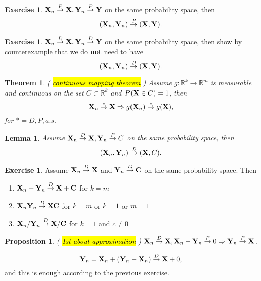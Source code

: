 \documentclass[12pt,a4paper, notitlepage]{book}
\newcommand{\hlc}[2][yellow]{ {\sethlcolor{#1} \hl{#2}} }
\theoremstyle{definition} %
\newtheorem{exercise}[definition]{Exercise}
\theoremstyle{plain} %
\newtheorem{lemma}[definition]{Lemma}
\newtheorem{theorem}[definition]{Theorem}
\newtheorem{proposition}[definition]{Proposition}
\newcommand{\R}{\mathbb R}
\newcommand{\Important}[1]{ {\it \hlc{#1} } }
\begin{document}
\begin{exercise}
${\bf X}_n \overset{P}{\rightarrow} {\bf X}, {\bf Y}_n \overset{P}{\rightarrow} {\bf Y}$ on the same probability space, then 
\[ ({\bf X}_n, {\bf Y}_n) \overset{P}{ \rightarrow} ({\bf X}, {\bf Y}) . \]
\end{exercise}

\begin{exercise}
${\bf X}_n \overset{D}{ \rightarrow} {\bf X}, {\bf Y}_n \overset{D}{\rightarrow} {\bf Y}$ on the same probability space, then show by counterexample that we do {\bf not} need to have 
\[ ({\bf X}_n, {\bf Y}_n) \overset{D}{ \rightarrow} ({\bf X}, {\bf Y}) . \]
\end{exercise}

\begin{theorem} (\Important{ continuous mapping theorem})
Assume $ g: \R^k \rightarrow \R^m$ is measurable and continuous on the set $C \subset \R^k$ and $P({\bf X} \in C) = 1$, then 
\[ {\bf X}_n \overset{*}{\rightarrow} {\bf X} \Rightarrow g({\bf X}_n) \overset{*}{ \rightarrow} g({\bf X}) , \]
 for $ * = D, P, a.s.$
\end{theorem}



\begin{lemma}
Assume ${\bf X}_n \overset{D}{\rightarrow} {\bf X}, {\bf Y}_n \overset{P}{\rightarrow} C$ on the same probability space, then 
\[ ({\bf X}_n, {\bf Y}_n) \overset{D}{\rightarrow} ({\bf X}, C) .\]
\end{lemma}

\begin{exercise}
Assume ${\bf X}_n \overset{D}{\rightarrow} {\bf X}$ and ${\bf Y}_n \overset{D}{\rightarrow} {\bf C}$ on the same probability space. Then
\begin{enumerate}
\item ${\bf X}_n + {\bf Y}_n \overset{D}{  \rightarrow} {\bf X} + {\bf C}$ for $k = m$
\item ${\bf X}_n  {\bf Y}_n \overset{D}{ \rightarrow } {\bf X}  {\bf C}$ for $k = m$ or $k = 1$ or $m = 1$
\item ${\bf X}_n / {\bf Y}_n \overset{D}{ \rightarrow} {\bf X} / {\bf C}$ for $k = 1$ and $c \neq 0$
\end{enumerate}
\end{exercise}

\begin{proposition} (\Important{1st about approximation})
${\bf X}_n \overset{D}{\rightarrow} {\bf X}, {\bf X}_n - {\bf Y}_n \overset{P}{\rightarrow} 0 \Rightarrow {\bf Y}_n \overset{P}{ \rightarrow } {\bf X}$.
\end{proposition}
\proof
\[ {\bf Y}_n = {\bf X}_n + ({\bf Y}_n - {\bf X}_n) \overset{D}{ \rightarrow} {\bf X} + 0 , \]
 and this is enough according to the previous exercise.
\endproof
\end{document}

